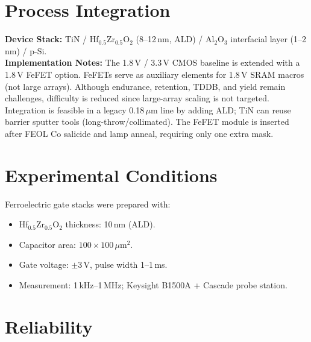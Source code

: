 \documentclass[journal]{IEEEtran}
\begin{document}
\section{Process Integration}
\textbf{Device Stack:} TiN / Hf$_{0.5}$Zr$_{0.5}$O$_2$ (8--12\,nm, ALD) / Al$_2$O$_3$ interfacial layer (1--2\,nm) / p-Si.\\
\textbf{Implementation Notes:} The 1.8\,V / 3.3\,V CMOS baseline is extended with a 1.8\,V FeFET option. FeFETs serve as auxiliary elements for 1.8\,V SRAM macros (not large arrays). Although endurance, retention, TDDB, and yield remain challenges, difficulty is reduced since large-array scaling is not targeted. Integration is feasible in a legacy 0.18\,$\mu$m line by adding ALD; TiN can reuse barrier sputter tools (long-throw/collimated). The FeFET module is inserted after FEOL Co salicide and lamp anneal, requiring only one extra mask.

\section{Experimental Conditions}
Ferroelectric gate stacks were prepared with:
\begin{itemize}
\item Hf$_{0.5}$Zr$_{0.5}$O$_2$ thickness: 10\,nm (ALD).
\item Capacitor area: $100\times100\,\mu$m$^2$.
\item Gate voltage: $\pm$3\,V, pulse width 1--1\,ms.
\item Measurement: 1\,kHz--1\,MHz; Keysight B1500A + Cascade probe station.
\end{itemize}

\section{Reliability}
\end{document}
